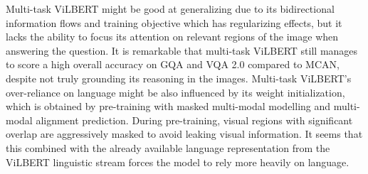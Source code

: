 \documentclass{article}
\begin{document}

Multi-task ViLBERT might be good at generalizing due to its bidirectional information flows and training objective which has regularizing effects, but it lacks the ability to focus its attention on relevant regions of the image when answering the question. It is remarkable that multi-task ViLBERT still manages to score a high overall accuracy on GQA and VQA 2.0 compared to MCAN, despite not truly grounding its reasoning in the images. Multi-task ViLBERT's over-reliance on language might be also influenced by its weight initialization, which is obtained by pre-training with masked multi-modal modelling and multi-modal alignment prediction. During pre-training, visual regions with significant overlap are aggressively masked to avoid leaking visual information. It seems that this combined with the already available language representation from the ViLBERT linguistic stream forces the model to rely more heavily on language. %


\end{document}
